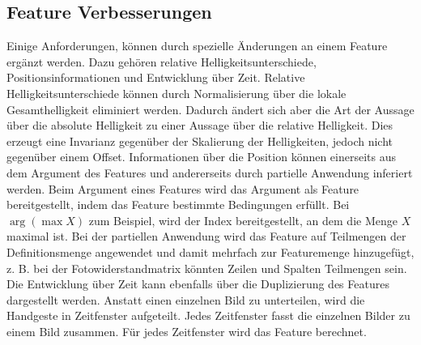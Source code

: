 \subsection{Feature Verbesserungen}
Einige Anforderungen, können durch spezielle Änderungen an einem Feature ergänzt werden. Dazu gehören relative Helligkeitsunterschiede, Positionsinformationen und Entwicklung über Zeit.
\newline
\newline
Relative Helligkeitsunterschiede können durch Normalisierung über die lokale Gesamthelligkeit eliminiert werden. Dadurch ändert sich aber die Art der Aussage über die absolute Helligkeit
zu einer Aussage über die relative Helligkeit. Dies erzeugt eine Invarianz gegenüber der Skalierung der Helligkeiten, jedoch nicht gegenüber einem Offset.
\newline
\newline
Informationen über die Position können einerseits aus dem Argument des Features und andererseits durch partielle Anwendung inferiert werden. Beim Argument eines Features wird das Argument als Feature
bereitgestellt, indem das Feature bestimmte Bedingungen erfüllt. Bei $\arg(\max X)$ zum Beispiel, wird der Index bereitgestellt, an dem die Menge $X$ maximal ist. Bei der partiellen Anwendung wird das Feature auf
Teilmengen der Definitionsmenge angewendet und damit mehrfach zur Featuremenge hinzugefügt, z. B. bei der Fotowiderstandmatrix könnten Zeilen und Spalten Teilmengen sein.
\newline
\newline
Die Entwicklung über Zeit kann ebenfalls über die Duplizierung des Features dargestellt werden. Anstatt einen einzelnen Bild zu unterteilen, wird die Handgeste in Zeitfenster aufgeteilt. Jedes Zeitfenster
fasst die einzelnen Bilder zu einem Bild zusammen. Für jedes Zeitfenster wird das Feature berechnet.